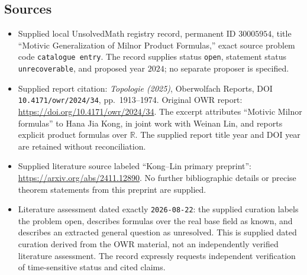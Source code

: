 \documentclass[11pt]{article}
\newcommand{\R}{\mathbb{R}}
\begin{document}
\subsection{Sources}
\begin{itemize}
\item Supplied local UnsolvedMath registry record, permanent ID \(30005954\), title ``Motivic Generalization of Milnor Product Formulas,'' exact source problem code \texttt{catalogue entry}. The record supplies status \texttt{open}, statement status \texttt{unrecoverable}, and proposed year \(2024\); no separate proposer is specified.
\item Supplied report citation: \emph{Topologie (2025)}, Oberwolfach Reports, DOI \texttt{10.4171/owr/2024/34}, pp.\ 1913--1974. Original OWR report: \url{https://doi.org/10.4171/owr/2024/34}. The excerpt attributes ``Motivic Milnor formulas'' to Hana Jia Kong, in joint work with Weinan Lin, and reports explicit product formulas over \(\R\). The supplied report title year and DOI year are retained without reconciliation.
\item Supplied literature source labeled ``Kong--Lin primary preprint'': \url{https://arxiv.org/abs/2411.12890}. No further bibliographic details or precise theorem statements from this preprint are supplied.
\item Literature assessment dated exactly \texttt{2026-08-22}: the supplied curation labels the problem open, describes formulas over the real base field as known, and describes an extracted general question as unresolved. This is supplied dated curation derived from the OWR material, not an independently verified literature assessment. The record expressly requests independent verification of time-sensitive status and cited claims.
\end{itemize}
\end{document}
